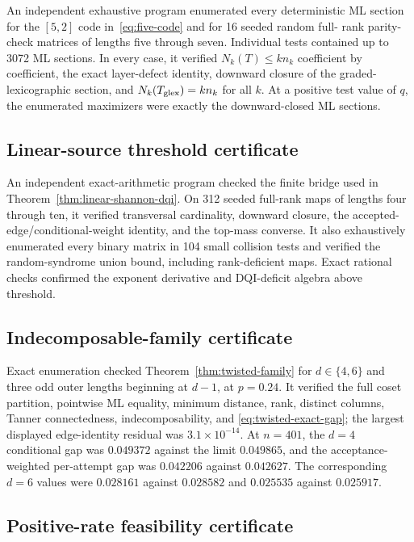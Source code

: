 \documentclass[journal]{IEEEtran}
\theoremstyle{definition}
\theoremstyle{remark}
\begin{document}
An independent exhaustive program enumerated every deterministic ML section
for the $[5,2]$ code in~\eqref{eq:five-code} and for 16 seeded random full-
rank parity-check matrices of lengths five through seven.  Individual tests
contained up to 3072 ML sections.  In every case, it verified
$N_k(T)\le k n_k$ coefficient by coefficient, the exact layer-defect
identity, downward closure of the graded-lexicographic section, and
$N_k(T_{\rm glex})=k n_k$ for all $k$.  At a positive test value of $q$, the
enumerated maximizers were exactly the downward-closed ML sections.

\subsection{Linear-source threshold certificate}

An independent exact-arithmetic program checked the finite bridge used in
Theorem~\ref{thm:linear-shannon-dqi}.  On 312 seeded full-rank maps of lengths
four through ten, it verified transversal cardinality, downward closure, the
accepted-edge/conditional-weight identity, and the top-mass converse.  It
also exhaustively enumerated every binary matrix in 104 small collision tests
and verified the random-syndrome union bound, including rank-deficient maps.
Exact rational checks confirmed the exponent derivative and DQI-deficit
algebra above threshold.

\subsection{Indecomposable-family certificate}

Exact enumeration checked Theorem~\ref{thm:twisted-family} for
$d\in\{4,6\}$ and three odd outer lengths beginning at $d-1$, at $p=0.24$.
It verified the full coset partition, pointwise ML equality, minimum distance,
rank, distinct columns, Tanner connectedness, indecomposability, and
\eqref{eq:twisted-exact-gap}; the largest displayed edge-identity residual was
$3.1\times10^{-14}$.  At $n=401$, the $d=4$ conditional gap was $0.049372$
against the limit $0.049865$, and the acceptance-weighted per-attempt gap was
$0.042206$ against $0.042627$.  The corresponding $d=6$ values were
$0.028161$ against $0.028582$ and $0.025535$ against $0.025917$.

\subsection{Positive-rate feasibility certificate}
\end{document}
